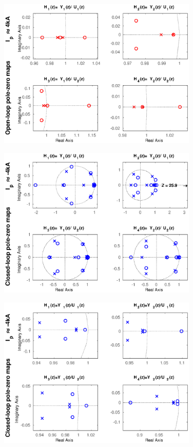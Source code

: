 \begin{figure}
	\centering
	\includegraphics[width=0.85\textwidth]{Chp5/PoleZero/PoleZeroOpenPosZoom.eps}
	\label{PoleZeroOpenPosZoom}
\end{figure}

\begin{figure}
	\centering
	\includegraphics[width=0.85\textwidth]{Chp5/PoleZero/PoleZeroCloseNeg.eps}
	\label{PoleZeroCloseNeg}
\end{figure}	

\begin{figure}
	\centering
	\includegraphics[width=0.85\textwidth]{Chp5/PoleZero/PoleZeroCloseNegZoom.eps}
	\label{PoleZeroCloseNegZoom}
\end{figure}	


